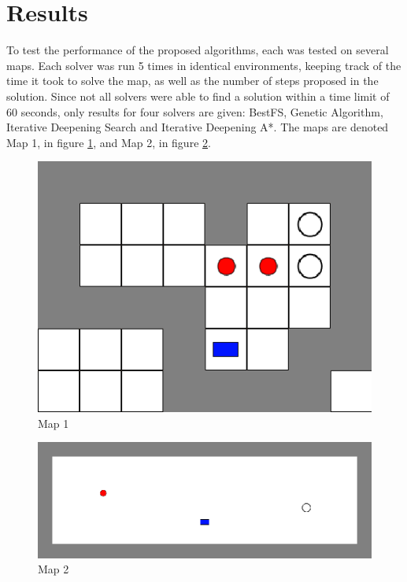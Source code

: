 \section{Results}\label{sec:results}
To test the performance of the proposed algorithms, each was tested on several maps. Each solver was run 5 times in identical environments, keeping track of the time it took to solve the map, as well as the number of steps proposed in the solution. Since not all solvers were able to find a solution within a time limit of 60 seconds, only results for four solvers are given: BestFS, Genetic Algorithm, Iterative Deepening Search and Iterative Deepening A*. The maps are denoted Map 1, in figure \ref{fig:map1}, and Map 2, in figure \ref{fig:map2}.

\begin{figure}
\center
\includegraphics[width=\columnwidth]{./images/map_1.png}
\caption{Map 1}
\label{fig:map1}
\end{figure}

\begin{figure}
\center
\includegraphics[width=\columnwidth]{./images/map_2.png}
\caption{Map 2}
\label{fig:map2}
\end{figure}

